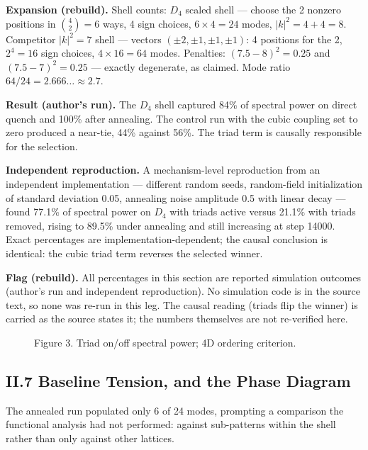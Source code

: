 \documentclass[11pt,a4paper]{article}
\newcommand{\expansion}[1]{\par\smallskip\noindent\textbf{Expansion (rebuild).} #1\par\smallskip}
\newcommand{\flagbox}[1]{\par\smallskip\noindent\textbf{Flag (rebuild).} #1\par\smallskip}
\begin{document}
\expansion{Shell counts: $D_4$ scaled shell --- choose the 2 nonzero positions in $\binom{4}{2} = 6$ ways, 4 sign choices, $6 \times 4 = 24$ modes, $|k|^2 = 4 + 4 = 8$. Competitor $|k|^2 = 7$ shell --- vectors $(\pm2,\pm1,\pm1,\pm1)$: 4 positions for the 2, $2^4 = 16$ sign choices, $4 \times 16 = 64$ modes. Penalties: $(7.5-8)^2 = 0.25$ and $(7.5-7)^2 = 0.25$ --- exactly degenerate, as claimed. Mode ratio $64/24 = 2.666\ldots \approx 2.7$.}

\textbf{Result (author's run).} The $D_4$ shell captured 84\% of spectral power on direct quench and 100\% after annealing. The control run with the cubic coupling set to zero produced a near-tie, 44\% against 56\%. The triad term is causally responsible for the selection.

\textbf{Independent reproduction.} A mechanism-level reproduction from an independent implementation --- different random seeds, random-field initialization of standard deviation 0.05, annealing noise amplitude 0.5 with linear decay --- found 77.1\% of spectral power on $D_4$ with triads active versus 21.1\% with triads removed, rising to 89.5\% under annealing and still increasing at step 14000. Exact percentages are implementation-dependent; the causal conclusion is identical: the cubic triad term reverses the selected winner.
\flagbox{All percentages in this section are reported simulation outcomes (author's run and independent reproduction). No simulation code is in the source text, so none was re-run in this leg. The causal reading (triads flip the winner) is carried as the source states it; the numbers themselves are not re-verified here.}

\begin{figure}[h]
\centering
{}
\caption{Figure 3. Triad on/off spectral power; 4D ordering criterion.}
\end{figure}

\subsection{II.7 Baseline Tension, and the Phase Diagram}
The annealed run populated only 6 of 24 modes, prompting a comparison the functional analysis had not performed: against sub-patterns within the shell rather than only against other lattices.
\end{document}
